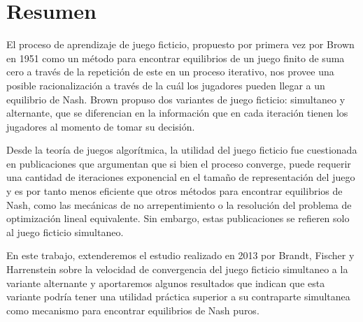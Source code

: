 \chapter*{Resumen}




El proceso de aprendizaje de juego ficticio, propuesto por primera vez por Brown en 1951 \cite{brown:1951} como un método para encontrar equilibrios de un juego finito de suma cero \cite{libro:rubinstein} a través de la repetición de este en un proceso iterativo, nos provee una posible racionalización a través de la cuál los jugadores pueden llegar a un equilibrio de Nash. Brown propuso dos variantes de juego ficticio: simultaneo y alternante, que se diferencian en la información que en cada iteración tienen los jugadores al momento de tomar su decisión.

Desde la teoría de juegos algorítmica, la utilidad del juego ficticio fue cuestionada en publicaciones que argumentan que si bien el proceso converge, puede requerir una cantidad de iteraciones exponencial en el tamaño de representación del juego y es por tanto menos eficiente que otros métodos para encontrar equilibrios de Nash, como las mecánicas de no arrepentimiento o la resolución del problema de optimización lineal equivalente. Sin embargo, estas publicaciones se refieren solo al juego ficticio simultaneo. 

En este trabajo, extenderemos el estudio realizado en 2013 por Brandt, Fischer y Harrenstein sobre la velocidad de convergencia del juego ficticio simultaneo a la variante alternante y aportaremos algunos resultados que indican que esta variante podría tener una utilidad práctica superior a su contraparte simultanea como mecanismo para encontrar equilibrios de Nash puros.